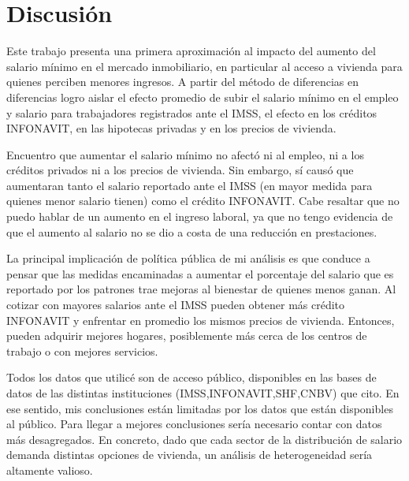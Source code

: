 \chapter{Discusión}
\label{ch:conclusions}



\noindent Este trabajo presenta una primera aproximación al impacto del aumento del salario mínimo en el mercado inmobiliario, en particular al acceso a vivienda para quienes perciben menores ingresos. A partir del método de diferencias en diferencias logro aislar el efecto promedio de subir el salario mínimo en el empleo y salario para trabajadores registrados ante el IMSS, el efecto en los créditos INFONAVIT, en las hipotecas privadas y en los precios de vivienda. 

Encuentro que aumentar el salario mínimo no afectó ni al empleo, ni a los créditos privados ni a los precios de vivienda. Sin embargo, sí causó que aumentaran tanto el salario reportado ante el IMSS (en mayor medida para quienes menor salario tienen) como el crédito INFONAVIT. Cabe resaltar que no puedo hablar de un aumento en el ingreso laboral, ya que no tengo evidencia de que el aumento al salario no se dio a costa de una reducción en prestaciones.

La principal implicación de política pública de mi análisis es que conduce a pensar que las medidas encaminadas a aumentar el porcentaje del salario que es reportado por los patrones trae mejoras al bienestar de quienes menos ganan. Al cotizar con mayores salarios ante el IMSS pueden obtener más crédito INFONAVIT y enfrentar en promedio los mismos precios de vivienda. Entonces, pueden adquirir mejores hogares, posiblemente más cerca de los centros de trabajo o con mejores servicios.



Todos los datos que utilicé son de acceso público, disponibles en las bases de datos de las distintas instituciones (IMSS,INFONAVIT,SHF,CNBV) que cito. En ese sentido, mis conclusiones están limitadas por los datos que están disponibles al público. Para llegar a mejores conclusiones sería necesario contar con datos más desagregados. En concreto, dado que cada sector de la distribución de salario demanda distintas opciones de vivienda, un análisis de heterogeneidad sería altamente valioso. 

